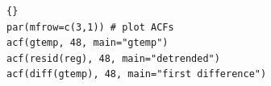 \begin{lstlisting}[title={‘Código R: ejemplo 1 Correlogramas de series.’},basicstyle=\ttfamily]{}
par(mfrow=c(3,1)) # plot ACFs
acf(gtemp, 48, main="gtemp")
acf(resid(reg), 48, main="detrended")
acf(diff(gtemp), 48, main="first difference")
\end{lstlisting}



